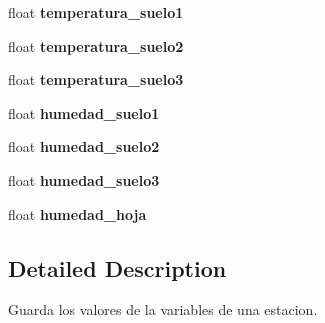 \begin{DoxyCompactItemize}
\item 
float {\bfseries temperatura\+\_\+suelo1}\hypertarget{struct_variables_a31d688dae638b43c28ebfd9f6e23bc07}{}\label{struct_variables_a31d688dae638b43c28ebfd9f6e23bc07}

\item 
float {\bfseries temperatura\+\_\+suelo2}\hypertarget{struct_variables_a09cd7f707f203036b28f1e31e6ea90fa}{}\label{struct_variables_a09cd7f707f203036b28f1e31e6ea90fa}

\item 
float {\bfseries temperatura\+\_\+suelo3}\hypertarget{struct_variables_aead113615a8aa3f314ae4b922e07853d}{}\label{struct_variables_aead113615a8aa3f314ae4b922e07853d}

\item 
float {\bfseries humedad\+\_\+suelo1}\hypertarget{struct_variables_ae7aa237a32703778c6aba3590d02b4c3}{}\label{struct_variables_ae7aa237a32703778c6aba3590d02b4c3}

\item 
float {\bfseries humedad\+\_\+suelo2}\hypertarget{struct_variables_af824647942cda68df571a841e5627f60}{}\label{struct_variables_af824647942cda68df571a841e5627f60}

\item 
float {\bfseries humedad\+\_\+suelo3}\hypertarget{struct_variables_a8b1521520bf33c5cef19fd867aec8175}{}\label{struct_variables_a8b1521520bf33c5cef19fd867aec8175}

\item 
float {\bfseries humedad\+\_\+hoja}\hypertarget{struct_variables_a9fc4a4eba0726e4d744cd6572eb9c250}{}\label{struct_variables_a9fc4a4eba0726e4d744cd6572eb9c250}

\end{DoxyCompactItemize}


\subsection{Detailed Description}
Guarda los valores de la variables de una estacion. 


